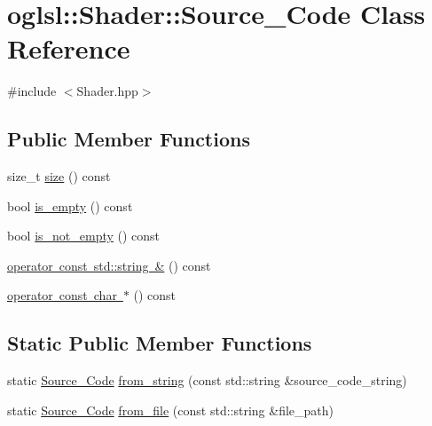 \hypertarget{classoglsl_1_1_shader_1_1_source___code}{}\section{oglsl\+:\+:Shader\+:\+:Source\+\_\+\+Code Class Reference}
\label{classoglsl_1_1_shader_1_1_source___code}


{\ttfamily \#include $<$Shader.\+hpp$>$}

\subsection*{Public Member Functions}
\begin{DoxyCompactItemize}
\item 
size\+\_\+t \mbox{\hyperlink{classoglsl_1_1_shader_1_1_source___code_ab1ea89bfdad1d955982b2821457f9d13}{size}} () const
\item 
bool \mbox{\hyperlink{classoglsl_1_1_shader_1_1_source___code_a3da37bbe585ebd1e5d3c22e5fbdbf73d}{is\+\_\+empty}} () const
\item 
bool \mbox{\hyperlink{classoglsl_1_1_shader_1_1_source___code_ad67238c4cf313b838a94e7f4a41a0eb6}{is\+\_\+not\+\_\+empty}} () const
\item 
\mbox{\hyperlink{classoglsl_1_1_shader_1_1_source___code_a1305244d85aabc655fba7cf4f55cc5b4}{operator const std\+::string \&}} () const
\item 
\mbox{\hyperlink{classoglsl_1_1_shader_1_1_source___code_a0e0ee6581e24a6633294a6db926b8b7c}{operator const char $\ast$}} () const
\end{DoxyCompactItemize}
\subsection*{Static Public Member Functions}
\begin{DoxyCompactItemize}
\item 
static \mbox{\hyperlink{classoglsl_1_1_shader_1_1_source___code}{Source\+\_\+\+Code}} \mbox{\hyperlink{classoglsl_1_1_shader_1_1_source___code_a9bb3f9ec92c2ca8e88ed4505ee3673d5}{from\+\_\+string}} (const std\+::string \&source\+\_\+code\+\_\+string)
\item 
static \mbox{\hyperlink{classoglsl_1_1_shader_1_1_source___code}{Source\+\_\+\+Code}} \mbox{\hyperlink{classoglsl_1_1_shader_1_1_source___code_adac6de037ca94b53b53db86ca1bca304}{from\+\_\+file}} (const std\+::string \&file\+\_\+path)
\end{DoxyCompactItemize}



